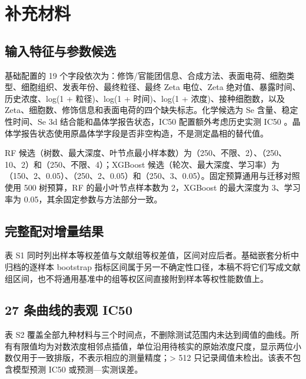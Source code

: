 \appendix
\renewcommand{\thetable}{S\arabic{table}}
\setcounter{table}{0}
\section{补充材料}

\subsection{输入特征与参数候选}

基础配置的 19 个字段依次为：修饰/官能团信息、合成方法、表面电荷、细胞类型、细胞组织、发表年份、最终粒径、最终 Zeta 电位、Zeta 绝对值、暴露时间、历史浓度、log(1 + 粒径)、log(1 + 时间)、log(1 + 浓度)、接种细胞数，以及 Zeta、细胞数、修饰信息和表面电荷的四个缺失标志。化学候选为 Se 含量、稳定性时间、Se 3d 结合能和晶体学报告状态，IC50 配置额外考虑历史实测 IC50 。晶体学报告状态使用原晶体学字段是否非空构造，不是测定晶相的替代值。

RF 候选（树数、最大深度、叶节点最小样本数）为（250、不限、2）、（250、10、2）和（250、不限、4）；XGBoost 候选（轮次、最大深度、学习率）为（150、2、0.05）、（250、2、0.05）和（250、3、0.05）。固定预算通用与迁移对照使用 500 树预算，RF 的最小叶节点样本数为 2，XGBoost 的最大深度为 3、学习率为 0.05，其余固定参数与方法部分一致。

\subsection{完整配对增量结果}

表 S1 同时列出样本等权差值与文献组等权差值，区间对应后者。基础嵌套分析中归档的逐样本 bootstrap 指标区间属于另一不确定性口径，本稿不将它们写成文献组区间，也不将通用基准中的组等权区间直接附到样本等权性能数值上。

\begin{table}[H]
\centering
\caption{各配置相对对应基线的配对 MAE 差值，单位为存活率百分点。负值表示误差下降，区间来自 24 个文献组等权差值的 5000 次 bootstrap。}
\label{tab:paired_comparisons}
\small

\end{table}

\subsection{27 条曲线的表观 IC50}

表 S2 覆盖全部九种材料与三个时间点，不删除测试范围内未达到阈值的曲线。所有有限值均为对数浓度相邻点插值，单位沿用待核实的原始浓度尺度，显示两位小数仅用于一致排版，不表示相应的测量精度；> 512 只记录阈值未检出。该表不包含模型预测 IC50 或预测—实测误差。


